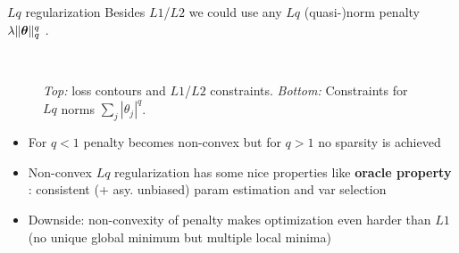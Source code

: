 \documentclass[11pt,compress,t,notes=noshow, xcolor=table]{beamer}
\begin{document}
\begin{vbframe}{$Lq$ regularization}
Besides $L1$/$L2$ we could use any $Lq$ (quasi-)norm penalty $\lambda \Vert \bm{\theta} \Vert_q^q$ .


\begin{figure}
  \\
\caption{{\scriptsize \textit{Top:} loss contours and $L1$/$L2$ constraints.
\textit{Bottom:} Constraints for $Lq$ norms $\sum_j |\theta_j|^q$.}}
\end{figure}
\vspace{-0.4cm}
{\footnotesize
\begin{itemize}
    \item For $q<1$ penalty becomes non-convex but for $q>1$ no sparsity is achieved
    \item Non-convex $Lq$ regularization has some nice properties like \textbf{oracle property} : consistent (+ asy. unbiased) param estimation and var selection
    \item Downside: non-convexity of penalty makes optimization even harder than $L1$ (no unique global minimum but multiple local minima)
\end{itemize}
}
\end{vbframe}
\end{document}
